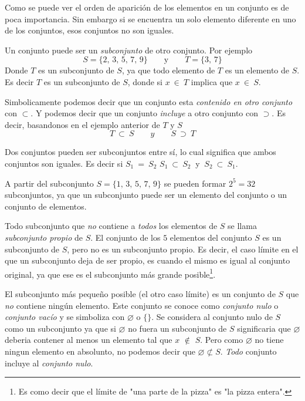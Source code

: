 Como se puede ver el orden de aparición de los elementos en un conjunto es de poca importancia. Sin embargo si se encuentra un solo elemento
diferente en uno de los conjuntos, esos conjuntos no son iguales.

Un conjunto puede ser un \emph{subconjunto} de otro conjunto. Por ejemplo
\[
S = \{2 ,\,  3 ,\,  5 ,\,  7 ,\,  9\} \qquad \text{y} \qquad T = \{3 ,\,  7 \}
\]
Donde \(T\) es un subconjunto de \(S\), ya que todo elemento de \(T\) es un elemento de \(S\).
Es decir \(T\) es un subconjunto de \(S\), donde si \(x ~\in~ T\) implica que \(x ~\in~ S\). 

Simbolicamente podemos decir que un conjunto esta \emph{contenido en otro conjunto} con \(\subset\). 
Y podemos decir que un conjunto \emph{incluye} a otro conjunto con \(\supset \). Es decir, basandonos en el ejemplo anterior de
\(T\) y \(S\)
\[
T ~\subset~ S \qquad y \qquad S~ \supset ~T 
\]

Dos conjuntos pueden ser subconjuntos entre sí, lo cual significa que ambos conjuntos son iguales. Es decir si 
\(S_1 ~=~ S_2\) \quad \(S_1 ~\subset~ S_2~\) y \(~S_2 ~\subset~ S_1\).

A partir del subconjunto \(S = \{1,\, 3,\, 5,\, 7,\, 9\}\) se pueden formar \(2^5 = 32\) subconjuntos, ya que un subconjunto
puede ser un elemento del conjunto o un conjunto de elementos.

Todo subconjunto que \textit{no} contiene a \textit{todos} los elementos de \(S\) se llama \emph{subconjunto propio} de \(S\). 
El conjunto de los \(5\) elementos del conjunto \(S\) es un subconjunto de \(S\), pero no es un subconjunto propio. 
Es decir, el caso límite en el que un subconjunto deja de ser propio, es cuando el mismo es igual al conjunto original, ya que ese es 
el subconjunto más grande posible\footnote{Es como decir que el límite de "una parte de la pizza" es "la pizza entera".}. 

El subconjunto más pequeño posible (el otro caso límite) es un conjunto de \(S\) que \textit{no} contiene ningún elemento.
Este conjunto se conoce como \textit{conjunto nulo} o \textit{conjunto vacío} y se simboliza con \(\varnothing\) o \(\{\}\).
Se considera al conjunto nulo de \(S\) como un subconjunto ya que si \(\varnothing\) no fuera un subconjunto de \(S\) significaria que \(\varnothing\) 
deberia contener al menos un elemento tal que \(x\) \(\notin\) \(S\). Pero como \(\varnothing\) no tiene ningun elemento en absolunto, no podemos
decir que \(\varnothing \not\subset S\).
\textit{Todo} conjunto incluye al \textit{conjunto nulo}.

